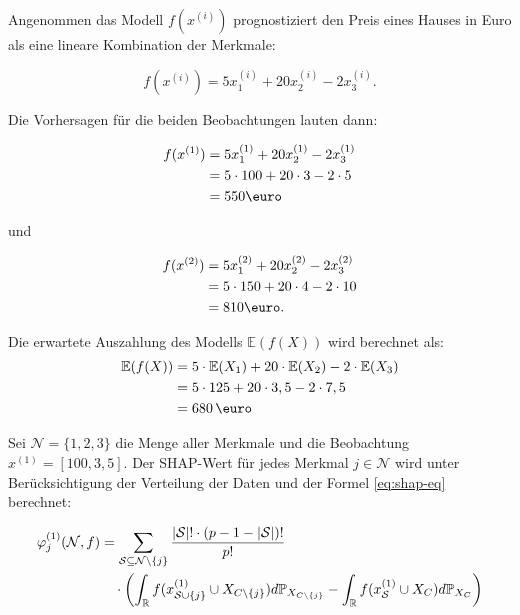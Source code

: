 Angenommen das Modell $f(x^{(i)})$ prognostiziert den Preis eines Hauses in Euro als eine lineare Kombination der Merkmale:

\begin{equation}
    f(x^{(i)}) = 5x_1^{(i)} + 20x_2^{(i)} - 2x_3^{(i)}.
\end{equation}

Die Vorhersagen für die beiden Beobachtungen lauten dann:

\begin{align}
    f(x^{(1)}) &= 5x_1^{(1)} + 20x_2^{(1)} - 2x_3^{(1)} \\ \notag
        &= 5 \cdot 100 + 20 \cdot 3 - 2 \cdot 5 \\ \notag
        &= 550 \text{\euro} 
\end{align}

und 

\begin{align}
    f(x^{(2)}) &= 5x_1^{(2)} + 20x_2^{(2)} - 2x_3^{(2)} \\ \notag
        &= 5 \cdot 150 + 20 \cdot 4 - 2 \cdot 10 \\ \notag
        &= 810 \text{\euro}. 
\end{align}

Die erwartete Auszahlung des Modells $\mathbb{E}(f(X))$ wird berechnet als:
\begin{align}
    \mathbb{E}(f(X)) &= 5 \cdot \mathbb{E}(X_1) + 20 \cdot \mathbb{E}(X_2) - 2 \cdot \mathbb{E}(X_3) \\ \notag
                     &= 5 \cdot 125 + 20 \cdot 3,5 - 2 \cdot 7,5 \\ \notag
                     &= 680 \,\text{\euro}
\end{align}

Sei $\mathcal{N} = \{1, 2, 3\}$ die Menge aller Merkmale und die Beobachtung $x^{(1)} = [100, 3, 5]$. 
Der SHAP-Wert für jedes Merkmal $j \in \mathcal{N}$ wird unter Berücksichtigung der Verteilung der 
Daten und der Formel \ref{eq:shap-eq} berechnet:

\begin{align}
    \label{eq:shap-formular}
    \varphi^{(1)}_{j} (\mathcal{N}, f) &= \sum_{\mathcal{S} \subseteq \mathcal{N} \setminus \{j\}} \frac{|\mathcal{S}|! \cdot (p - 1 - |\mathcal{S}|)!}{p!} \\ \notag
    &\quad \cdot \left( \int_{\mathbb{R}} f(x^{(1)}_{\mathcal{S} \cup \{j\}} \cup X_{C \setminus \{j\}}) d\mathbb{P}_{X_{C \setminus \{j\}}} -
    \int_{\mathbb{R}} f(x^{(1)}_{\mathcal{S}} \cup X_{C}) d\mathbb{P}_{X_{C}} \right) 
\end{align}

